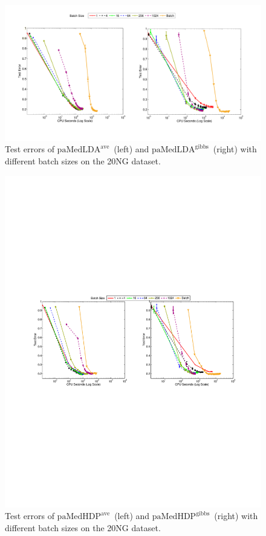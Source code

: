 \documentclass[twoside,11pt]{article}
\newcommand\paMedLDAave{$\text{paMedLDA}^{\text{ave}}$~}
\newcommand\paMedLDAgibbs{$\text{paMedLDA}^{\text{gibbs}}$~}
\newcommand\paMedHDPave{$\text{paMedHDP}^{\text{ave}}$~}
\newcommand\paMedHDPgibbs{$\text{paMedHDP}^{\text{gibbs}}$~}
\begin{document}
\begin{figure}[t]
\includegraphics[width = .95\textwidth]{plot_multic_batchsize_jmlr-eps.pdf}\vspace*{-0.2cm}
\caption{Test errors of \paMedLDAave (left) and \paMedLDAgibbs (right) with different batch sizes on the 20NG dataset. }
\label{fg:multic_batchsize}\vspace*{-0.4cm}
\end{figure}
\begin{figure}[t]
\includegraphics[width = .95\textwidth]{plot_multic_batchsize_hdp_jmlr.pdf}\vspace*{-0.2cm}
\caption{Test errors of \paMedHDPave (left) and \paMedHDPgibbs (right) with different batch sizes on the 20NG dataset. }
\label{fg:multic_batchsize_hdp}\vspace*{-0.2cm}
\end{figure}
\end{document}
